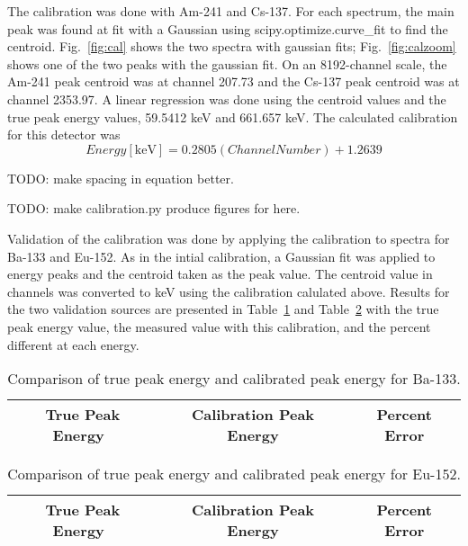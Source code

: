 The calibration was done with Am-241 and Cs-137. For each spectrum, the main peak was found at fit with a Gaussian using scipy.optimize.curve\_fit to find the centroid. Fig.~\ref{fig:cal} shows the two spectra with gaussian fits; Fig.~\ref{fig:calzoom} shows one of the two peaks with the gaussian fit. On an 8192-channel scale, the Am-241 peak centroid was at channel 207.73 and the Cs-137 peak centroid was at channel 2353.97. A linear regression was done using the centroid values and the true peak energy values, 59.5412 keV and 661.657 keV. The calculated calibration for this detector was
\begin{equation}
  Energy \mathrm{ [keV]} = 0.2805 (Channel Number) + 1.2639 
\end{equation}

{\color{red}TODO: make spacing in equation better.} 

{\color{red}TODO: make calibration.py produce figures for here.} 

% 

Validation of the calibration was done by applying the calibration to spectra for Ba-133 and Eu-152. As in the intial calibration, a Gaussian fit was applied to energy peaks and the centroid taken as the peak value. The centroid value in channels was converted to keV using the calibration calulated above. Results for the two validation sources are presented in Table~\ref{tab:valBa133} and Table~\ref{tab:valEu152} with the true peak energy value, the measured value with this calibration, and the percent different at each energy. 

\begin{table}[H]
  \centering 
  \caption{Comparison of true peak energy and calibrated peak energy for Ba-133.} 
  \begin{tabular}{|ccc|} 
    \hline 
    True Peak Energy~\cite{lblndata} & Calibration Peak Energy & Percent Error \\ 
    \hline 
    
    \hline  
  \end{tabular} 
  \label{tab:valBa133}
\end{table} 

\begin{table}[H]
  \centering 
  \caption{Comparison of true peak energy and calibrated peak energy for Eu-152.} 
  \begin{tabular}{|ccc|} 
    \hline 
    True Peak Energy~\cite{lblndata} & Calibration Peak Energy & Percent Error \\ 
    \hline 
    
    \hline  
  \end{tabular} 
  \label{tab:valEu152}
\end{table} 

